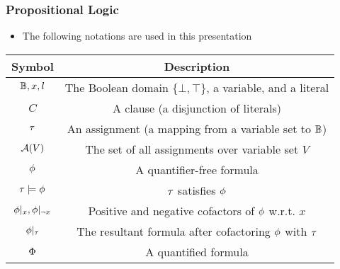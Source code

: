 \begin{frame}
    \frametitle{Propositional Logic}
    \begin{itemize}
        \item The following notations are used in this presentation
              \pause
    \end{itemize}
    \begin{table}[t]
        \centering
        \begin{tabular}{c|c}
            Symbol                      & Description                                                   \\
            \hline
            $\mathbb{B},x,l$              & The Boolean domain $\{\bot,\top\}$, a variable, and a literal \\
            $C$                         & A clause (a disjunction of literals)                          \\
            $\tau$                       & An assignment (a mapping from a variable set to $\mathbb{B}$)   \\
            $\mathcal{A}(V)$                    & The set of all assignments over variable set $V$              \\
            $\phi$                       & A quantifier-free formula                                     \\
            $\tau\models\phi$             & $\tau$ satisfies $\phi$                                         \\
            $\phi|_{x},\phi|_{\lnot x}$ & Positive and negative cofactors of $\phi$ w.r.t. $x$           \\
            $\phi|_{\tau}$            & The resultant formula after cofactoring $\phi$ with $\tau$      \\
            $\Phi$                       & A quantified formula                                          \\
        \end{tabular}
    \end{table}
\end{frame}
